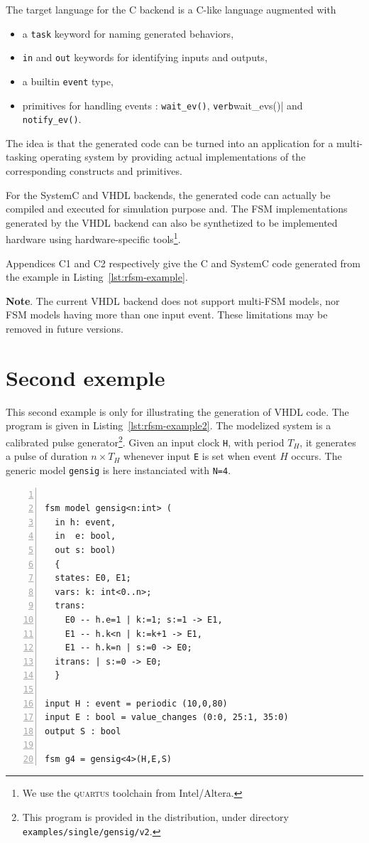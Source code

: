 \medskip
The target language for the C backend is a C-like language augmented with
\begin{itemize}
\item a \verb|task| keyword for naming generated behaviors,
\item \verb|in| and \verb|out| keywords for identifying inputs and outputs,
\item a builtin \verb|event| type,
\item primitives for handling events : \verb|wait_ev()|, \verb|verb|wait_evs()| and
  \verb|notify_ev()|. 
\end{itemize}
The idea is that the generated code can be turned into an application for a multi-tasking operating
system by providing actual implementations of the corresponding constructs and primitives.

\medskip
For the SystemC and VHDL backends, the generated code can actually be compiled and executed for
simulation purpose and. The FSM implementations generated by the VHDL backend can also be
synthetized to be implemented hardware using hardware-specific tools\footnote{We use the
  \textsc{quartus} toolchain from Intel/Altera.}. 

\medskip
Appendices C1 and C2 respectively give the C and SystemC code generated from the example in
Listing~\ref{lst:rfsm-example}. 

\medskip
\textbf{Note}. The current VHDL backend does not support multi-FSM models, nor FSM models having
more than one input event. These limitations may be removed in future versions.

\section{Second exemple}
\label{sec:second-example}

This second example is only for illustrating the generation of VHDL code.  The program is given in
Listing~\ref{lst:rfsm-example2}. The modelized system is a calibrated pulse generator\footnote{This
  program is provided in the distribution, under directory
  \texttt{examples/single/gensig/v2}.}. Given an input clock \verb|H|, with period $T_H$, it
generates a pulse of duration $n \times T_H$ whenever input \texttt{E} is set when event $H$
occurs. The generic model \verb|gensig| is here instanciated with \verb|N=4|.

\begin{lstlisting}[language=Rfsm,frame=single,numbers=left,caption=A multi-model RFSM
  program,label={lst:rfsm-example2},float]

fsm model gensig<n:int> (
  in h: event,
  in  e: bool,
  out s: bool)
  {
  states: E0, E1;
  vars: k: int<0..n>;
  trans: 
    E0 -- h.e=1 | k:=1; s:=1 -> E1,
    E1 -- h.k<n | k:=k+1 -> E1,
    E1 -- h.k=n | s:=0 -> E0;
  itrans: | s:=0 -> E0;
  }

input H : event = periodic (10,0,80)
input E : bool = value_changes (0:0, 25:1, 35:0)
output S : bool 

fsm g4 = gensig<4>(H,E,S)
\end{lstlisting}

